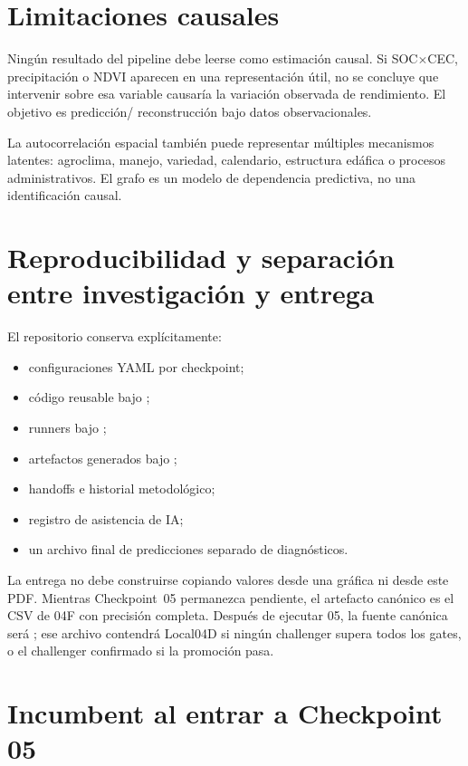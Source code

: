 \section{Limitaciones causales}

Ningún resultado del pipeline debe leerse como estimación causal. Si SOC$\times$CEC,
precipitación o NDVI aparecen en una representación útil, no se concluye que intervenir sobre
esa variable causaría la variación observada de rendimiento. El objetivo es predicción/
reconstrucción bajo datos observacionales.

La autocorrelación espacial también puede representar múltiples mecanismos latentes:
agroclima, manejo, variedad, calendario, estructura edáfica o procesos administrativos. El
grafo es un modelo de dependencia predictiva, no una identificación causal.

\section{Reproducibilidad y separación entre investigación y entrega}

El repositorio conserva explícitamente:
\begin{itemize}
\item configuraciones YAML por checkpoint;
\item código reusable bajo ;
\item runners bajo ;
\item artefactos generados bajo ;
\item handoffs e historial metodológico;
\item registro de asistencia de IA;
\item un archivo final de predicciones separado de diagnósticos.
\end{itemize}

La entrega no debe construirse copiando valores desde una gráfica ni desde este PDF. Mientras
Checkpoint~05 permanezca pendiente, el artefacto canónico es el CSV de 04F con precisión
completa. Después de ejecutar 05, la fuente canónica será
; ese archivo contendrá Local04D si
ningún challenger supera todos los gates, o el challenger confirmado si la promoción pasa.

\section{Incumbent al entrar a Checkpoint 05}

